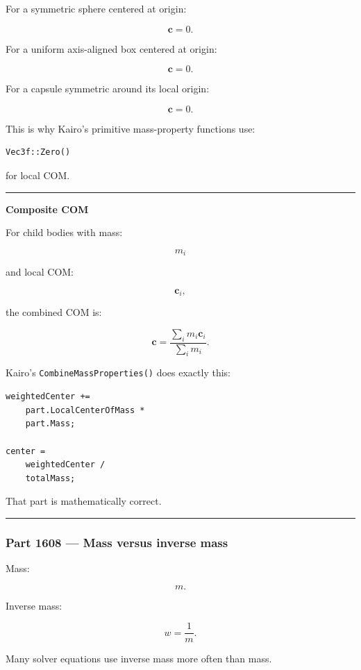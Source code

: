 For a symmetric sphere centered at origin:

\[
\mathbf{c}=0.
\]

For a uniform axis-aligned box centered at origin:

\[
\mathbf{c}=0.
\]

For a capsule symmetric around its local origin:

\[
\mathbf{c}=0.
\]

This is why Kairo's primitive mass-property functions use:

\begin{verbatim}
Vec3f::Zero()
\end{verbatim}

for local COM.

\begin{center}\rule{0.5\linewidth}{0.5pt}\end{center}

\textbf{Composite COM}

For child bodies with mass:

\[
m_i
\]

and local COM:

\[
\mathbf{c}_i,
\]

the combined COM is:

\[
\boxed{
\mathbf{c}
=
\frac{
\sum_i m_i\mathbf{c}_i
}{
\sum_i m_i
}.
}
\]

Kairo's \texttt{CombineMassProperties()} does exactly this:

\begin{verbatim}
weightedCenter +=
    part.LocalCenterOfMass *
    part.Mass;

center =
    weightedCenter /
    totalMass;
\end{verbatim}

That part is mathematically correct.

\begin{center}\rule{0.5\linewidth}{0.5pt}\end{center}

\subsubsection{Part 1608 --- Mass versus inverse mass}\label{part-1608-mass-versus-inverse-mass}

Mass:

\[
m.
\]

Inverse mass:

\[
w=
\frac{1}{m}.
\]

Many solver equations use inverse mass more often than mass.

